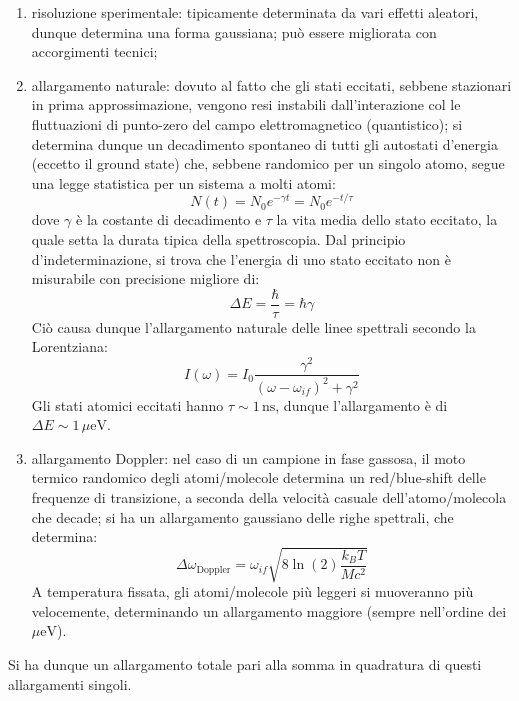 \begin{enumerate}
	\item risoluzione sperimentale: tipicamente determinata da vari effetti aleatori, dunque determina una forma gaussiana; può essere migliorata con accorgimenti tecnici;
	\item allargamento naturale: dovuto al fatto che gli stati eccitati, sebbene stazionari in prima approssimazione, vengono resi instabili dall'interazione col le fluttuazioni di punto-zero del campo elettromagnetico (quantistico); si determina dunque un decadimento spontaneo di tutti gli autostati d'energia (eccetto il ground state) che, sebbene randomico per un singolo atomo, segue una legge statistica per un sistema a molti atomi:
	\begin{equation*}
		N(t) = N_0 e^{- \gamma t} = N_0 e^{- t / \tau}
	\end{equation*}
	dove $ \gamma $ è la costante di decadimento e $ \tau $ la vita media dello stato eccitato, la quale setta la durata tipica della spettroscopia. Dal principio d'indeterminazione, si trova che l'energia di uno stato eccitato non è misurabile con precisione migliore di:
	\begin{equation*}
		\Delta E = \frac{\hbar}{\tau} = \hbar \gamma
	\end{equation*}
	Ciò causa dunque l'allargamento naturale delle linee spettrali secondo la Lorentziana:
	\begin{equation*}
		I(\omega) = I_0 \frac{\gamma^2}{(\omega - \omega_{if})^2 + \gamma^2}
	\end{equation*}
	Gli stati atomici eccitati hanno $ \tau \sim 1\,\text{ns} $, dunque l'allargamento è di $ \Delta E \sim 1\,\mu\text{eV} $.
	\item allargamento Doppler: nel caso di un campione in fase gassosa, il moto termico randomico degli atomi/molecole determina un red/blue-shift delle frequenze di transizione, a seconda della velocità casuale dell'atomo/molecola che decade; si ha un allargamento gaussiano delle righe spettrali, che determina:
	\begin{equation*}
		\Delta \omega_\text{Doppler} = \omega_{if} \sqrt{8 \ln(2) \frac{k_B T}{M c^2}}
	\end{equation*}
	A temperatura fissata, gli atomi/molecole più leggeri si muoveranno più velocemente, determinando un allargamento maggiore (sempre nell'ordine dei $ \mu\text{eV} $).
\end{enumerate}
Si ha dunque un allargamento totale pari alla somma in quadratura di questi allargamenti singoli.










